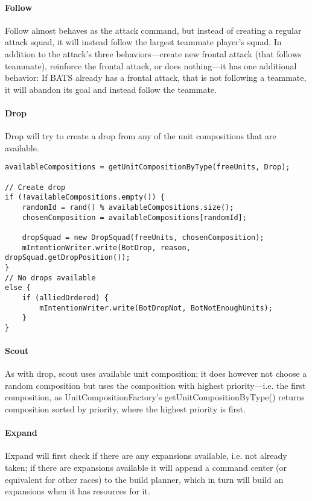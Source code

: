 \paragraph{Follow}
Follow almost behaves as the attack command, but instead of creating a regular attack squad, it will instead follow the largest teammate player’s squad. In addition to the attack’s three behaviors—create new frontal attack (that follows teammate), reinforce the frontal attack, or does nothing—it has one additional behavior: If BATS already has a frontal attack, that is not following a teammate, it will abandon its goal and instead follow the teammate.

\paragraph{Drop}
Drop will try to create a drop from any of the unit compositions that are available.
\begin{lstlisting}[label={lst:order_drop},caption={Pseudo-code for the drop command}]
availableCompositions = getUnitCompositionByType(freeUnits, Drop);

// Create drop
if (!availableCompositions.empty()) {
	randomId = rand() % availableCompositions.size();
	chosenComposition = availableCompositions[randomId];

	dropSquad = new DropSquad(freeUnits, chosenComposition);
	mIntentionWriter.write(BotDrop, reason, dropSquad.getDropPosition());
}
// No drops available
else {
	if (alliedOrdered) {
		mIntentionWriter.write(BotDropNot, BotNotEnoughUnits);
	}
}
\end{lstlisting}

\paragraph{Scout}
As with drop, scout uses available unit composition; it does however not choose a random composition but uses the composition with highest priority—i.e. the first composition, as UnitCompositionFactory’s getUnitCompositionByType() returns composition sorted by priority, where the highest priority is first.

\paragraph{Expand}
Expand will first check if there are any expansions available, i.e. not already taken; if there are expansions available it will append a command center (or equivalent for other races) to the build planner, which in turn will build an expansions when it has resources for it.

